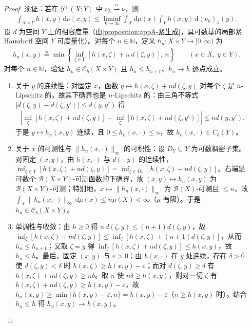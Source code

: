 \documentclass[../../main.tex]{subfiles}%
\begin{document}
\begin{proof}
须证：若在 $\mathcal{Y}^+(X;Y)$ 中 $\nu_k\stackrel{n}{\rightharpoonup}\nu$，则
\begin{align}
\int_{X\times Y}h(x,y)\,\mathrm{d}\nu(x,y)
\leqslant\liminf_{k\to\infty}\int_X\mathrm{d}\mu(x)\int_Y h(x,y)\,\mathrm{d}(\nu_k)_x(y).\label{align:ch05-5.62}
\end{align}
设 $d$ 为空间 $Y$ 上的相容度量（由\cref{proposition:appA-紧生成}，具可数基的局部紧 Hausdorff 空间 $Y$ 可度量化）。对每个 $n\in\mathbb{N}$，定义 $h_n:X\times Y\to[0,\infty)$ 为
\begin{align*}
h_n(x,y)\triangleq \min\left\{\inf_{\zeta\in Y}[h(x,\zeta)+n\,d(\zeta,y)],\ n\right\}
\qquad(x\in X,\ y\in Y).
\end{align*}
对每个 $n\in\mathbb{N}$，验证 $h_n\in\mathcal{C}_b(X\times Y)$ 且 $h_n\leqslant h_{n+1}$、$h_n\to h$ 逐点成立。
\begin{enumerate}[(1)]
\item 关于 $y$ 的连续性：对固定 $x$，函数 $y\mapsto h(x,\zeta)+n d(\zeta,y)$ 对每个 $\zeta$ 是 $n$-Lipschitz 的，故其下确界也是 $n$-Lipschitz 的：由三角不等式 $|d(\zeta,y)-d(\zeta,y')|\leqslant d(y,y')$ 得
\begin{align*}
\left|\inf_{\zeta}[h(x,\zeta)+n d(\zeta,y)]-\inf_{\zeta}[h(x,\zeta)+n d(\zeta,y')]\right|\leqslant n d(y,y').
\end{align*}
于是 $y\mapsto h_n(x,y)$ 连续，且 $0\leqslant h_n(x,\cdot)\leqslant n$，故 $h_n(x,\cdot)\in C_b(Y)$。
\item 关于 $x$ 的可测性与 $\|h_n(x,\cdot)\|_\infty$ 的可积性：设 $D_Y\subseteq Y$ 为可数稠密子集。对固定 $(x,y)$，由 $h(x,\cdot)$ 与 $d(\cdot,y)$ 的连续性，$\inf_{\zeta\in Y}[h(x,\zeta)+n d(\zeta,y)]=\inf_{\zeta\in D_Y}[h(x,\zeta)+n d(\zeta,y)]$。右端是可数个 $\mathscr{B}(X\times Y)$-可测函数的下确界，故 $(x,y)\mapsto h_n(x,y)$ 为 $\mathscr{B}(X\times Y)$-可测；特别地，$x\mapsto\|h_n(x,\cdot)\|_\infty$ 为 $\mathscr{B}(X)$-可测且 $\leqslant n$，故 $\int_X\|h_n(x,\cdot)\|_\infty\,\mathrm{d}\mu(x)\leqslant n\mu(X)<\infty$（$\mu$ 有限）。于是 $h_n\in\mathcal{C}_b(X\times Y)$。
\item 单调性与收敛：由 $h\geqslant0$ 得 $n\,d(\zeta,y)\leqslant(n+1)d(\zeta,y)$，故 $\inf_\zeta[h(x,\zeta)+n d(\zeta,y)]\leqslant\inf_\zeta[h(x,\zeta)+(n+1)d(\zeta,y)]$，从而 $h_n\leqslant h_{n+1}$；又取 $\zeta=y$ 得 $\inf_\zeta[h(x,\zeta)+n d(\zeta,y)]\leqslant h(x,y)$，故 $h_n\leqslant h$。最后，固定 $(x,y)$ 与 $\varepsilon>0$；由 $h(x,\cdot)$ 在 $y$ 处连续，存在 $\delta>0$ 使 $d(\zeta,y)<\delta$ 时 $h(x,\zeta)\geqslant h(x,y)-\varepsilon$；而对 $d(\zeta,y)\geqslant\delta$ 有 $h(x,\zeta)+n d(\zeta,y)\geqslant n\delta$。取 $n$ 使 $n\delta\geqslant h(x,y)$，则对一切 $\zeta$ 有 $h(x,\zeta)+n d(\zeta,y)\geqslant h(x,y)-\varepsilon$，故 $h_n(x,y)\geqslant\min\{h(x,y)-\varepsilon,n\}=h(x,y)-\varepsilon$（$n\geqslant h(x,y)$ 时）。结合 $h_n\leqslant h$ 得 $h_n(x,y)\to h(x,y)$。

\end{enumerate}
\end{proof}
\end{document}
